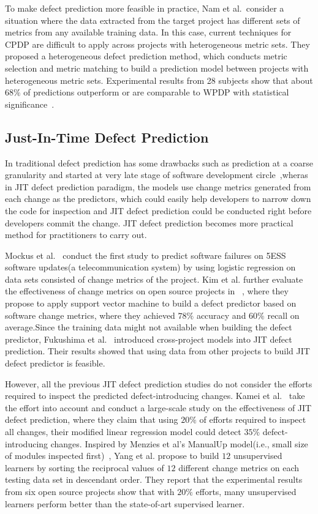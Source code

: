 To make defect prediction more feasible in practice, Nam et al.~\cite{nam2015heterogeneous}consider a situation where the data extracted from the
target project has different sets of metrics from any available training data. In this case,
current techniques for CPDP are difficult to apply across projects with heterogeneous metric sets. They proposed a  heterogeneous defect prediction method, which conducts metric selection and metric matching to build a prediction model between projects with heterogeneous metric sets. Experimental results  from 28 subjects show that about $68\%$ of predictions outperform or are comparable to WPDP with statistical significance~\cite{nam2015heterogeneous}.


\subsection{Just-In-Time Defect Prediction}
In traditional defect prediction has some drawbacks such as prediction at a coarse granularity and started at very late stage of software development circle~\cite{kamei2013large},wheras in JIT defect prediction paradigm, the models use change metrics generated from each change as the predictors, which
could easily help developers to narrow down the code for inspection and JIT defect prediction could be conducted right before developers commit the change. JIT defect prediction becomes more practical method for practitioners to carry out.

Mockus et al.~\cite{mockus2000predicting} conduct the first study to predict 
software failures on 5ESS software updates(a telecommunication system)
by using logistic regression on 
data sets consisted of change metrics of the project. Kim et al.
further evaluate the effectiveness of change metrics  on open source projects in ~\cite{kim2008classifying}, where they propose to apply support vector machine to build a defect predictor based on software change metrics, where they achieved $78\%$ accuracy and $60\%$ recall on average.Since the training data might
not available when building the defect predictor, Fukushima et al.~\cite{fukushima2014empirical} introduced
cross-project models into JIT defect prediction. Their results showed that using data from other projects to build JIT defect predictor is feasible. 

However, all the previous JIT defect prediction studies do not consider the efforts required to inspect the predicted defect-introducing changes. Kamei et al.~\cite{kamei2013large} take the effort into account and conduct a large-scale study on the effectiveness of JIT defect prediction, where they claim that using $
20\%$ of efforts required to inspect all changes, their modified linear regression model could
detect $35\%$ defect-introducing changes. Inspired by Menzies et al's ManualUp model(i.e., small size of modules inspected first)~\cite{menzies2010defect}, Yang et al. propose to build $12$ unsupervised learners by sorting the reciprocal values of $12$ different change metrics on each testing data set in descendant order. They
report that the experimental results from six open source projects
show that with $20\%$ efforts, many
unsupervised learners perform better than the state-of-art supervised learner.

